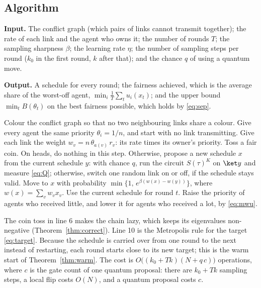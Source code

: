 \documentclass[11pt,a4paper]{article}
\begin{document}
\subsection{Algorithm}

\noindent\textbf{Input.} The conflict graph (which pairs of links cannot transmit together); the rate of
each link and the agent who owns it; the number of rounds $T$; the sampling sharpness $\beta$; the
learning rate $\eta$; the number of sampling steps per round ($k_0$ in the first round, $k$ after that);
and the chance $q$ of using a quantum move.

\noindent\textbf{Output.} A schedule for every round; the fairness achieved, which is the average share
of the worst-off agent, $\min_i\frac1T\sum_tu_i(x_t)$; and the upper bound $\min_tB(\theta_t)$ on the
best fairness possible, which holds by \eqref{eq:sep}.

\begin{algorithmic}[1]
\State Colour the conflict graph so that no two neighbouring links share a colour.
\State Give every agent the same priority $\theta_i=1/n$, and start with no link transmitting.
  \State Give each link the weight $w_v=n\,\theta_{a(v)}\,r_v$: its rate times its owner's priority.
    \State Toss a fair coin. On heads, do nothing in this step.
    \State Otherwise, propose a new schedule $x$ from the current schedule $y$:
    \State \hspace{1.5em}with chance $q$, run the circuit $S(\tau)^K$ on $\ket y$ and measure \eqref{eq:Q};
    \State \hspace{1.5em}otherwise, switch one random link on or off, if the schedule stays valid.
    \State Move to $x$ with probability $\min\{1,\,e^{\beta(w(x)-w(y))}\}$, where $w(x)=\sum_vw_vx_v$.
  \EndFor
  \State Use the current schedule for round $t$.
  \State Raise the priority of agents who received little, and lower it for agents who received a
  lot, by \eqref{eq:mwu}.
\EndFor
\end{algorithmic}

\noindent The coin toss in line 6 makes the chain lazy, which keeps its eigenvalues non-negative
(Theorem~\ref{thm:correct}). Line 10 is the Metropolis rule for the target \eqref{eq:target}. Because
the schedule is carried over from one round to the next instead of restarting, each round starts close
to its new target; this is the warm start of Theorem~\ref{thm:warm}. The cost is
$O\bigl((k_0+Tk)(N+q\,c)\bigr)$ operations, where $c$ is the gate count of one quantum proposal: there
are $k_0+Tk$ sampling steps, a local flip costs $O(N)$, and a quantum proposal costs $c$.
\end{document}
